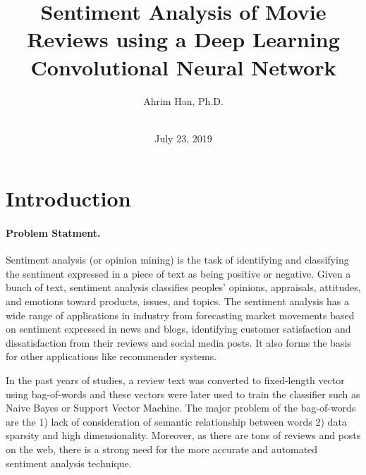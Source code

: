 \documentclass[11pt]{article}
\begin{document}
 



\title{Sentiment Analysis of Movie Reviews using a Deep Learning Convolutional Neural Network}

\author
{Ahrim Han, Ph.D.\\
\\
}


\date{July 23, 2019}





\maketitle 
\newpage

\doublespacing
\tableofcontents
\singlespacing
\newpage

\baselineskip24pt

\section{Introduction}

\paragraph*{Problem Statment.}

Sentiment analysis (or opinion mining) is the task of identifying and classifying the sentiment expressed in a piece of text as being positive or negative. 
%
Given a bunch of text, sentiment analysis classifies peoples’ opinions, appraisals, attitudes, and emotions toward products, issues, and topics. 
%
The sentiment analysis has a wide range of applications in industry from forecasting market movements based on sentiment expressed in news and blogs, identifying customer satisfaction and dissatisfaction from their reviews and social media posts. It also forms the basis for other applications like recommender systems. 

In the past years of studies, a review text was converted to fixed-length vector using bag-of-words and these vectors were later used to train the classifier such as Naive Bayes or Support Vector Machine. The major problem of the bag-of-words are the 1) lack of consideration of semantic relationship between words 2) data sparsity and high dimensionality. Moreover, as there are tons of reviews and posts on the web, there is a strong need for the more accurate and automated sentiment analysis technique.
\end{document}
